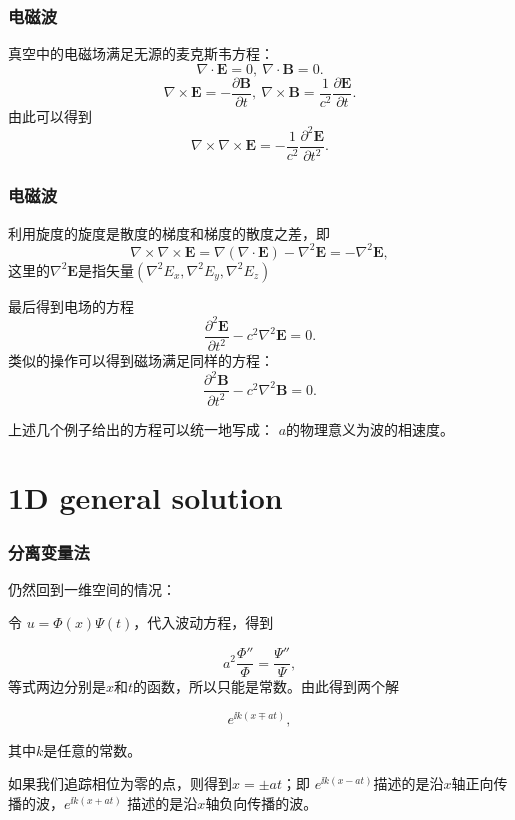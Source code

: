 \documentclass[CJK]{beamer}
\begin{document}
\begin{frame}
\frametitle{电磁波}
真空中的电磁场满足无源的麦克斯韦方程：
$$ \nabla\cdot \mathbf{E} = 0,\ \nabla\cdot\mathbf{B} = 0.$$
$$\nabla\times \mathbf{E} = - \frac{\partial \mathbf{B}}{\partial t},\ \nabla\times \mathbf{B} = \frac{1}{c^2} \frac{\partial \mathbf{E}}{\partial t}.$$
由此可以得到
$$\nabla\times \nabla\times \mathbf{E} = - \frac{1}{c^2}\frac{\partial^2\mathbf{E}}{\partial t^2}.$$
\end{frame}

\begin{frame}
  \frametitle{电磁波}
  利用{\blue 旋度的旋度是散度的梯度和梯度的散度之差}，即
  $$ \nabla\times \nabla\times \mathbf{E} = \nabla(\nabla\cdot\mathbf{E}) - \nabla^2\mathbf{E} = -\nabla^2\mathbf{E},$$
  这里的$\nabla^2\mathbf{E}$是指矢量$(\nabla^2E_x, \nabla^2E_y, \nabla^2E_z)$

  最后得到电场的方程
  $$ \frac{\partial^2\mathbf{E}}{\partial t^2} - c^2\nabla^2\mathbf{E} = 0. $$
  类似的操作可以得到磁场满足同样的方程：
  $$ \frac{\partial^2\mathbf{B}}{\partial t^2} - c^2\nabla^2\mathbf{B} = 0. $$  
\end{frame}


\begin{frame}
上述几个例子给出的方程可以统一地写成：
$a$的物理意义为波的相速度。

\end{frame}


\section{1D general solution}

\begin{frame}
\frametitle{分离变量法}

仍然回到一维空间的情况：

令 $u = \Phi(x)\Psi(t)$，代入波动方程，得到

$$ a^2\frac{\Phi'' }{\Phi} =  \frac{\Psi''}{\Psi}, $$
等式两边分别是$x$和$t$的函数，所以只能是常数。由此得到两个解

$$ e^{\ii k(x\mp at)}, $$

其中$k$是任意的常数。

如果我们追踪相位为零的点，则得到$x = \pm at$；即 $e^{\ii k(x - at)}$描述的是沿$x$轴正向传播的波，$e^{\ii k(x + at)}$ 描述的是沿$x$轴负向传播的波。


\end{frame}
\end{document}

